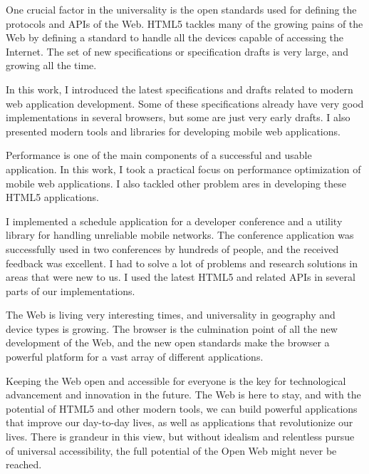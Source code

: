 One crucial factor in the universality is the open standards used for
defining the protocols and APIs of the Web. HTML5 tackles many of the
growing pains of the Web by defining a standard to handle all the
devices capable of accessing the Internet. The set of new
specifications or specification drafts is very large, and growing all
the time.

In this work, I introduced the latest specifications and drafts
related to modern web application development. Some of these
specifications already have very good implementations in several
browsers, but some are just very early drafts. I also presented modern
tools and libraries for developing mobile web applications.

Performance is one of the main components of a successful and usable
application. In this work, I took a practical focus on performance
optimization of mobile web applications. I also tackled other problem
ares in developing these HTML5 applications.

I implemented a schedule application for a developer conference and a
utility library for handling unreliable mobile networks. The
conference application was successfully used in two conferences by
hundreds of people, and the received feedback was excellent. I had to
solve a lot of problems and research solutions in areas that were new
to us. I used the latest HTML5 and related APIs in several parts of
our implementations.

The Web is living very interesting times, and universality in
geography and device types is growing. The browser is the culmination
point of all the new development of the Web, and the new open
standards make the browser a powerful platform for a vast array of
different applications.

Keeping the Web open and accessible for everyone is the key for
technological advancement and innovation in the future. The Web is
here to stay, and with the potential of HTML5 and other modern tools,
we can build powerful applications that improve our day-to-day lives,
as well as applications that revolutionize our lives. There is
grandeur in this view, but without idealism and relentless pursue of
universal accessibility, the full potential of the Open Web might
never be reached.
